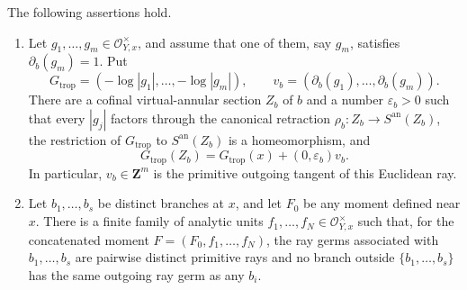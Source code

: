 \begin{proposition}
The following assertions hold.
\begin{enumerate}
\item\label{itm:p21p3-gf-bridge:ray}
Let \(g_1,\ldots,g_m\in\mathcal O_{Y,x}^{\times}\), and assume that one
of them, say \(g_m\), satisfies \(\partial_b(g_m)=1\).  Put
\[
 G_{\mathrm{trop}}
   =(-\log|g_1|,\ldots,-\log|g_m|),
 \qquad
 v_b=(\partial_b(g_1),\ldots,\partial_b(g_m)).
\]
There are a cofinal virtual-annular section \(Z_b\) of \(b\) and a number
\(\varepsilon_b>0\) such that every \(|g_j|\) factors through the canonical
retraction \(\rho_b:Z_b\to S^{\mathrm{an}}(Z_b)\), the restriction of
\(G_{\mathrm{trop}}\) to \(S^{\mathrm{an}}(Z_b)\) is a homeomorphism, and
\begin{equation}
\label{eq:p21p3-gf-exact-branch-ray}
 G_{\mathrm{trop}}(Z_b)
 =G_{\mathrm{trop}}(x)+(0,\varepsilon_b)v_b.
\end{equation}
In particular, \(v_b\in\mathbf Z^m\) is the primitive outgoing tangent of
this Euclidean ray.

\item\label{itm:p21p3-gf-bridge:separation}
Let \(b_1,\ldots,b_s\) be distinct branches at \(x\), and let \(F_0\) be
any moment defined near \(x\).  There is a finite family of analytic units
\(f_1,\ldots,f_N\in\mathcal O_{Y,x}^{\times}\) such that, for the
concatenated moment \(F=(F_0,f_1,\ldots,f_N)\), the ray germs associated
with \(b_1,\ldots,b_s\) are pairwise distinct primitive rays and no branch
outside \(\{b_1,\ldots,b_s\}\) has the same outgoing ray germ as any
\(b_i\).


\end{enumerate}
\end{proposition}
